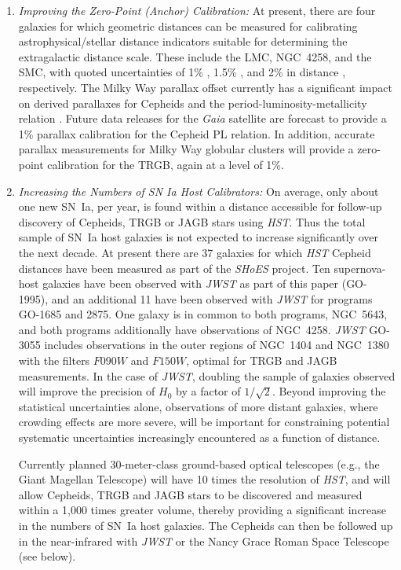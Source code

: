 \documentclass[12pt,modern]{aastex631}
\newcommand{\gaia}{\emph{Gaia}\xspace}
\newcommand{\ho}{$H_{0}$\xspace}
\newcommand{\hst}{\emph{HST}\xspace}
\newcommand{\jwst}{\emph{JWST}\xspace}
\newcommand{\sn}{SN~Ia\xspace}
\newcommand{\shoes}{\emph{SHoES}\xspace}
\newcommand{\ngc}{NGC\,\xspace}
\begin{document}
\begin{enumerate}
\item{\it Improving the Zero-Point (Anchor) Calibration:} At present, there are four galaxies for which geometric distances can be measured for calibrating astrophysical/stellar distance indicators suitable for determining the extragalactic distance scale. These include the LMC, \ngc 4258, and the SMC, with quoted uncertainties of  
1\% \citep{pietrzynski_2019},  1.5\% \citep{reid_2019}, and 2\% in distance \citep{graczyk_2020}, respectively. The Milky Way parallax offset currently has a significant impact on derived parallaxes for Cepheids and the period-luminosity-metallicity relation \citep[e.g., see][for a discussion of the current uncertainties]{groenewegen_2021, owens_2022}. Future data releases for the \gaia satellite are forecast to provide a 1\% parallax calibration for the Cepheid PL relation. In addition, accurate parallax measurements for Milky Way globular clusters will provide a zero-point calibration for the TRGB, again at a level of 1\%.

\item{\it Increasing the Numbers of SN Ia Host Calibrators:} On average, only about one new \sn, per year,  is found within a distance accessible for follow-up discovery of Cepheids, TRGB or JAGB stars using \hst. Thus the total sample of \sn host galaxies is not expected to increase significantly over the next decade. At present there are 37 galaxies for which \hst Cepheid distances have been measured as part of the \shoes project. Ten supernova-host galaxies have been observed with \jwst as part of this paper (GO-1995), and an additional 11 have been observed with \jwst for programs GO-1685 and 2875. One galaxy is in common to both programs, \ngc 5643, and both programs additionally have observations of \ngc 4258.  \jwst GO-3055 includes observations in the outer regions of \ngc 1404 and \ngc 1380 with the filters $F090W$ and $F150W$, optimal for TRGB and JAGB measurements. 
In the case of \jwst, doubling the sample of galaxies observed will improve the precision of \ho by a factor of $1/\sqrt 2$. Beyond improving the statistical uncertainties alone, observations of more distant galaxies, where crowding effects are more severe, will be important for constraining potential systematic uncertainties increasingly encountered as a function of distance.

Currently planned 30-meter-class ground-based optical telescopes (e.g., the Giant Magellan Telescope) will have 10 times the resolution of \hst, and will allow Cepheids, TRGB and JAGB stars to be discovered and measured within a 1,000 times greater volume, thereby providing a significant increase in the numbers of \sn host galaxies.  The Cepheids can then be followed up in the near-infrared with \jwst or the Nancy Grace Roman Space Telescope (see below).


\end{enumerate}
\end{document}
